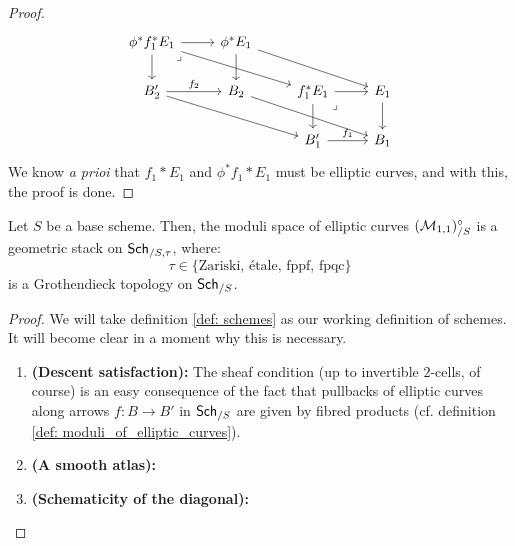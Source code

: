 \begin{proof}
                            $$
                                \begin{tikzcd}
                                	{\phi^* f_1^* E_1} & {\phi^*E_1} \\
                                	{B_2'} & {B_2} & {f_1^* E_1} & {E_1} \\
                                	&& {B'_1} & {B_1}
                                	\arrow[from=2-1, to=3-3]
                                	\arrow["{f_2}", from=2-1, to=2-2]
                                	\arrow["{f_1}", from=3-3, to=3-4]
                                	\arrow[from=2-2, to=3-4]
                                	\arrow[from=2-4, to=3-4]
                                	\arrow[from=1-2, to=2-2]
                                	\arrow[from=1-2, to=2-4]
                                	\arrow[from=2-3, to=2-4]
                                	\arrow[from=2-3, to=3-3]
                                	\arrow[from=1-1, to=2-1]
                                	\arrow[from=1-1, to=1-2]
                                	\arrow[from=1-1, to=2-3]
                                	\arrow["\lrcorner"{anchor=center, pos=0.125}, draw=none, from=2-3, to=3-4]
                                	\arrow["\lrcorner"{anchor=center, pos=0.125}, draw=none, from=1-1, to=2-2]
                                \end{tikzcd}
                            $$
                        We know \textit{a prioi} that $f_1* E_1$ and $\phi^* f_1* E_1$ must be elliptic curves, and with this, the proof is done.
                    \end{proof}
                
                \begin{proposition} \label{prop: moduli_stacks_of_elliptic_curves}
                    Let $S$ be a base scheme. Then, the moduli space of elliptic curves $(\mathcal{M}_{1, 1})_{/S}^{\circ}$ is a geometric stack on $\mathsf{Sch}_{/S, \tau}$, where:
                        $$\tau \in \{\text{Zariski, \'etale, fppf, fpqc}\}$$
                    is a Grothendieck topology on $\mathsf{Sch}_{/S}$.
                \end{proposition}
                    \begin{proof}
                        We will take definition \ref{def: schemes} as our working definition of schemes. It will become clear in a moment why this is necessary.
                        \begin{enumerate}
                            \item \textbf{(Descent satisfaction):} The sheaf condition (up to invertible $2$-cells, of course) is an easy consequence of the fact that pullbacks of elliptic curves along arrows $f: B \to B'$ in $\mathsf{Sch}_{/S}$ are given by fibred products (cf. definition \ref{def: moduli_of_elliptic_curves}).
                            \item \textbf{(A smooth atlas):} 
                            \item \textbf{(Schematicity of the diagonal):} 
                        \end{enumerate}
                    \end{proof}
            
